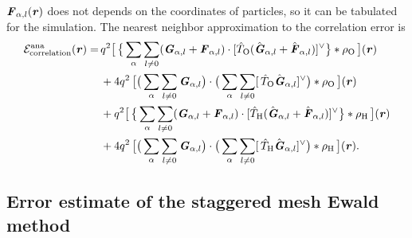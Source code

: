 \documentclass[aps,pre,preprint,unsortedaddress]{revtex4}
\renewcommand{\v}[1]{\textbf{\textit{#1}}}
\begin{document}
$\v F_{\alpha,l} (\v r)$ 
does not depends on the coordinates of particles,
so it can be tabulated  for the simulation.
The nearest neighbor approximation to the correlation error is
\begin{align}\nonumber
  \mathcal E^{\textrm{ana}}_{\textrm{correlation}}(\v r)
  =\,&
  q^2
  \big[\,
  \big\{
  \sum_{\alpha} \sum_{l\neq 0}
  (\v G_{\alpha,l}+\v F_{\alpha,l})\cdot
  [\hat T_{\textrm{O}} (\hat{\v G}_{\alpha,l}+\hat{\v F}_{\alpha,l})]^{\vee}
  \big\}
  \ast \rho_{\textrm{O}}
  \,\big] (\v r) \\\nonumber
  \,&+
  4q^2\,
  \big[
  \big(
  \sum_{\alpha} \sum_{l\neq 0}  
  \v G_{\alpha,l}
  \big)
  \cdot
  \big(
  \sum_{\alpha} \sum_{l\neq 0}  
  [\,\hat T_{\textrm{O}}\hat{\v G}_{\alpha,l}]^{\vee}
  \big)
  \ast \rho_{\textrm{O}}\,
  \big] (\v r) \\\nonumber
  \,&+
  q^2
  \big[\,
  \big\{
  \sum_{\alpha} \sum_{l\neq 0}
  (\v G_{\alpha,l}+\v F_{\alpha,l})\cdot
  [\hat T_{\textrm{H}} (\hat{\v G}_{\alpha,l}+\hat{\v F}_{\alpha,l})]^{\vee}
  \big\}
  \ast \rho_{\textrm{H}}
  \,\big] (\v r) \\
  \,&+
  4q^2\,
  \big[
  \big(
  \sum_{\alpha} \sum_{l\neq 0}  
  \v G_{\alpha,l}
  \big)
  \cdot
  \big(
  \sum_{\alpha} \sum_{l\neq 0}  
  [\,\hat T_{\textrm{H}}\hat{\v G}_{\alpha,l}]^{\vee}
  \big)
  \ast \rho_{\textrm{H}}\,
  \big] (\v r).
\end{align}



\subsection{Error estimate of the staggered mesh Ewald method}
\end{document}
